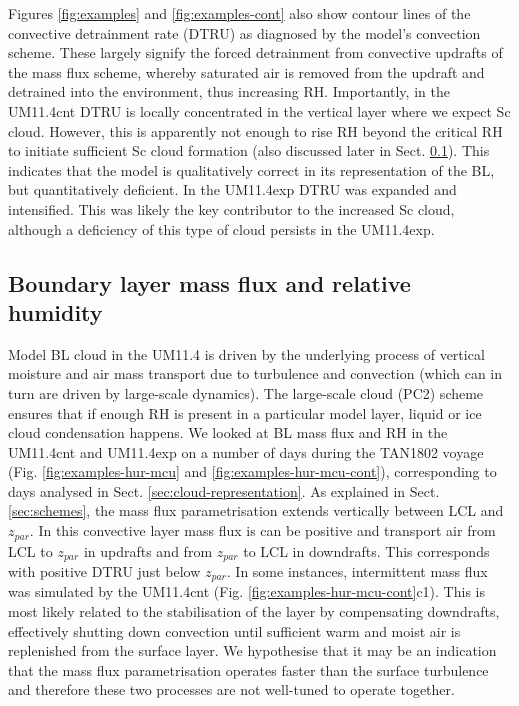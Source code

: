 Figures \ref{fig:examples} and \ref{fig:examples-cont} also show contour lines
of the convective detrainment rate (DTRU) as diagnosed by the model's
convection scheme. These largely signify the forced detrainment from convective
updrafts of the mass flux scheme, whereby saturated air is removed from the
updraft and detrained into the environment, thus increasing RH.
Importantly, in the UM11.4cnt DTRU is locally concentrated in the vertical layer
where we expect
Sc cloud. However, this is apparently not enough to rise RH beyond the critical RH
to initiate
sufficient Sc cloud formation (also discussed later in Sect.
\ref{sec:bl-mass-flux-and-rh}).
This indicates that the model is qualitatively correct in its representation
of the BL, but quantitatively deficient. In the UM11.4exp DTRU was expanded
and intensified. This was likely the key contributor to the increased
Sc cloud, although a deficiency of this type of cloud persists in the
UM11.4exp.

\subsection{Boundary layer mass flux and relative humidity}
\label{sec:bl-mass-flux-and-rh}

Model BL cloud in the UM11.4 is driven by the underlying process
of vertical moisture and air mass transport due to turbulence and convection
(which can in turn are driven by large-scale dynamics). The large-scale cloud
(PC2) scheme ensures that if enough RH is present in a particular model
layer, liquid or ice cloud condensation happens. We looked at BL mass
flux and RH in the UM11.4cnt and UM11.4exp on a number of days during the TAN1802
voyage (Fig. \ref{fig:examples-hur-mcu} and \ref{fig:examples-hur-mcu-cont}),
corresponding to days analysed in Sect. \ref{sec:cloud-representation}.
As explained in Sect. \ref{sec:schemes}, the mass flux parametrisation
extends vertically between LCL and $z_{par}$. In this convective layer mass
flux is can be positive and transport air from LCL to $z_{par}$ in updrafts
and from $z_{par}$ to LCL in downdrafts. This corresponds with positive
DTRU just below $z_{par}$. In some instances, intermittent mass flux was
simulated by the UM11.4cnt (Fig. \ref{fig:examples-hur-mcu-cont}c1). This
is most likely related to the stabilisation of the layer by compensating
downdrafts, effectively shutting down convection until sufficient warm
and moist air is replenished from the surface layer. We hypothesise that
it may be an indication that the mass flux parametrisation operates faster
than the surface turbulence and therefore these two processes are not
well-tuned to operate together.


